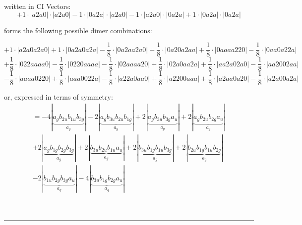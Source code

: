 \documentclass{article}
\begin{document}
\begin{minipage}{\linewidth}
written in CI Vectors: 
 $$+ 1 \cdot \left|a2a0 \right| \cdot \left| a2a0 \right| 
- 1 \cdot \left|0a2a \right| \cdot \left| a2a0 \right| 
- 1 \cdot \left|a2a0 \right| \cdot \left| 0a2a \right| 
+ 1 \cdot \left|0a2a \right| \cdot \left| 0a2a \right| 
$$



 forms the following possible dimer combinations:

$$+ 1 \cdot \left|a2a0a2a0 \right| + 1 \cdot \left|0a2a0a2a \right| - \frac{1}{8} \cdot \left|0a2aa2a0 \right| + \frac{1}{8} \cdot \left|0a20a2aa \right| + \frac{1}{8} \cdot \left|0aaaa220 \right| - \frac{1}{8} \cdot \left|0aa0a22a \right|  $$ $$ + \frac{1}{8} \cdot \left|022aaaa0 \right| - \frac{1}{8} \cdot \left|0220aaaa \right| - \frac{1}{8} \cdot \left|02aaaa20 \right| + \frac{1}{8} \cdot \left|02a0aa2a \right| + \frac{1}{8} \cdot \left|aa2a02a0 \right| - \frac{1}{8} \cdot \left|aa2002aa \right|  $$ $$ - \frac{1}{8} \cdot \left|aaaa0220 \right| + \frac{1}{8} \cdot \left|aaa0022a \right| - \frac{1}{8} \cdot \left|a22a0aa0 \right| + \frac{1}{8} \cdot \left|a2200aaa \right| + \frac{1}{8} \cdot \left|a2aa0a20 \right| - \frac{1}{8} \cdot \left|a2a00a2a \right| $$



\end{minipage}
\vspace{0.5cm}


or, expressed in terms of symmetry:\begin{multline*}
=-4\left|\underbrace{a_{g} b_{2u} b_{1u} b_{3g}}_{a_{g}}\right|-2\left|\underbrace{a_{g} b_{3u} b_{2u} b_{1g}}_{a_{g}}\right|+2\left|\underbrace{a_{g} b_{3u} b_{3g} a_{u}}_{a_{g}}\right|+2\left|\underbrace{a_{g} b_{2u} b_{2g} a_{u}}_{a_{g}}\right|\\
+2\left|\underbrace{a_{g} b_{1g} b_{2g} b_{3g}}_{a_{g}}\right|+2\left|\underbrace{b_{3u} b_{2u} b_{1u} a_{u}}_{a_{g}}\right|+2\left|\underbrace{b_{3u} b_{1g} b_{1u} b_{3g}}_{a_{g}}\right|+2\left|\underbrace{b_{2u} b_{1g} b_{1u} b_{2g}}_{a_{g}}\right|\\
-2\left|\underbrace{b_{1u} b_{2g} b_{3g} a_{u}}_{a_{g}}\right|-4\left|\underbrace{b_{3u} b_{1g} b_{2g} a_{u}}_{a_{g}}\right|
\end{multline*}\\\\

 


\hrule
\vspace{0.5cm}
\end{document}
